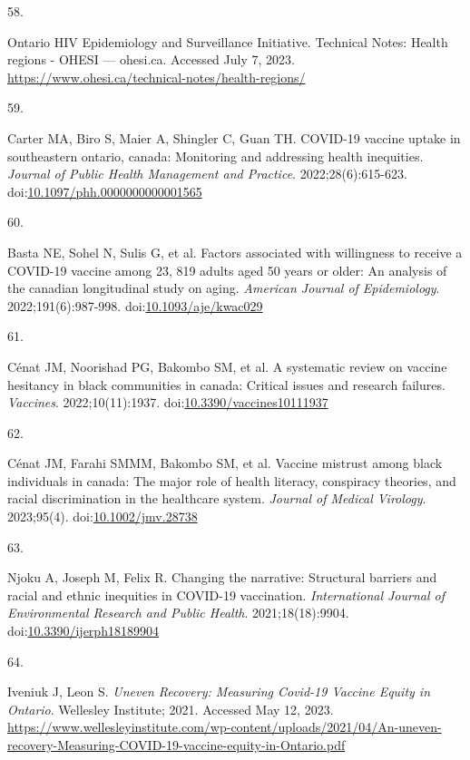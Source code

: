 \documentclass[
]{article}
\newlength{\cslhangindent}
\newlength{\csllabelwidth}
\newlength{\cslentryspacingunit} %
\newenvironment{CSLReferences}[2] %
 {%
  \setlength{\parindent}{0pt}
  \ifodd #1
  \let\oldpar\par
  \def\par{\hangindent=\cslhangindent\oldpar}
  \fi
  \setlength{\parskip}{#2\cslentryspacingunit}
 }%
 {}
\newcommand{\CSLLeftMargin}[1]{\parbox[t]{\csllabelwidth}{#1}}
\newcommand{\CSLRightInline}[1]{\parbox[t]{\linewidth - \csllabelwidth}{#1}\break}
\begin{document}
\begin{CSLReferences}{0}{0}
\leavevmode{}%
\CSLLeftMargin{58. }%
\CSLRightInline{Ontario HIV Epidemiology and Surveillance Initiative.
{T}echnical {N}otes: {H}ealth regions - {O}{H}{E}{S}{I} --- ohesi.ca.
Accessed July 7, 2023.
\url{https://www.ohesi.ca/technical-notes/health-regions/}}

\leavevmode{}%
\CSLLeftMargin{59. }%
\CSLRightInline{Carter MA, Biro S, Maier A, Shingler C, Guan TH.
{COVID}-19 vaccine uptake in southeastern ontario, canada: Monitoring
and addressing health inequities. \emph{Journal of Public Health
Management and Practice}. 2022;28(6):615-623.
doi:\href{https://doi.org/10.1097/phh.0000000000001565}{10.1097/phh.0000000000001565}}

\leavevmode{}%
\CSLLeftMargin{60. }%
\CSLRightInline{Basta NE, Sohel N, Sulis G, et al. Factors associated
with willingness to receive a {COVID}-19 vaccine among 23, 819 adults
aged 50 years or older: An analysis of the canadian longitudinal study
on aging. \emph{American Journal of Epidemiology}. 2022;191(6):987-998.
doi:\href{https://doi.org/10.1093/aje/kwac029}{10.1093/aje/kwac029}}

\leavevmode{}%
\CSLLeftMargin{61. }%
\CSLRightInline{Cénat JM, Noorishad PG, Bakombo SM, et al. A systematic
review on vaccine hesitancy in black communities in canada: Critical
issues and research failures. \emph{Vaccines}. 2022;10(11):1937.
doi:\href{https://doi.org/10.3390/vaccines10111937}{10.3390/vaccines10111937}}

\leavevmode{}%
\CSLLeftMargin{62. }%
\CSLRightInline{Cénat JM, Farahi SMMM, Bakombo SM, et al. Vaccine
mistrust among black individuals in canada: The major role of health
literacy, conspiracy theories, and racial discrimination in the
healthcare system. \emph{Journal of Medical Virology}. 2023;95(4).
doi:\href{https://doi.org/10.1002/jmv.28738}{10.1002/jmv.28738}}

\leavevmode{}%
\CSLLeftMargin{63. }%
\CSLRightInline{Njoku A, Joseph M, Felix R. Changing the narrative:
Structural barriers and racial and ethnic inequities in {COVID}-19
vaccination. \emph{International Journal of Environmental Research and
Public Health}. 2021;18(18):9904.
doi:\href{https://doi.org/10.3390/ijerph18189904}{10.3390/ijerph18189904}}

\leavevmode{}%
\CSLLeftMargin{64. }%
\CSLRightInline{Iveniuk J, Leon S. \emph{Uneven Recovery: Measuring
Covid-19 Vaccine Equity in Ontario}. Wellesley Institute; 2021. Accessed
May 12, 2023.
\url{https://www.wellesleyinstitute.com/wp-content/uploads/2021/04/An-uneven-recovery-Measuring-COVID-19-vaccine-equity-in-Ontario.pdf}}


\end{CSLReferences}
\end{document}

